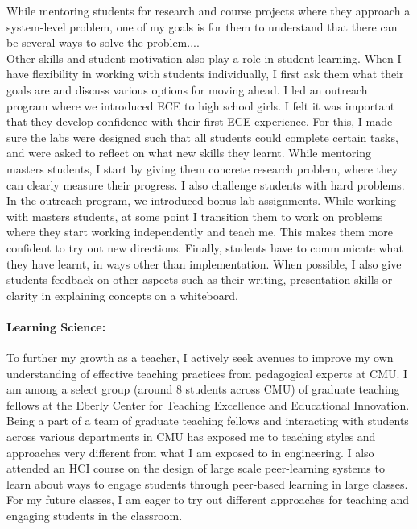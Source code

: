 \documentclass[10pt]{article}
\begin{document}
While mentoring students for research and course projects where they approach a system-level problem, one of my goals is for them to understand that there can be several ways to solve the problem.... \\



Other skills and student motivation also play a role in student learning. When I have flexibility in working with students individually, I first ask them what their goals are and discuss various options for moving ahead.
I led an outreach program where we introduced ECE to high school girls. I felt it was important that they develop confidence with their first ECE experience. For this, I made sure the labs were designed such that all students could complete certain tasks, and were asked to reflect on what new skills they learnt. While mentoring masters students, I start by giving them concrete research problem, where they can clearly measure their progress. I also challenge students with hard problems. In the outreach program, we introduced bonus lab assignments. While working with masters students, at some point I transition them to work on problems where they start working independently and teach me. This makes them more confident to try out new directions.  Finally, students have to communicate what they have learnt, in ways other than implementation. When possible, I also give students feedback on other aspects such as their writing, presentation skills or clarity in explaining concepts on a whiteboard. 

\paragraph{Learning Science: }To further my growth as a teacher, I actively seek avenues to improve my own understanding of effective teaching practices from pedagogical experts at CMU. I am among a select group (around 8 students across CMU) of graduate teaching fellows at the Eberly Center for Teaching Excellence and Educational Innovation. Being a part of a team of graduate teaching fellows and interacting with students across various departments in CMU has exposed me to teaching styles and approaches very different from what I am exposed to in engineering. I also attended an HCI course on the design of large scale peer-learning systems to learn about ways to engage students through peer-based learning in large classes. For my future classes, I am eager to try out different approaches for teaching and engaging students in the classroom.\\
\end{document}
